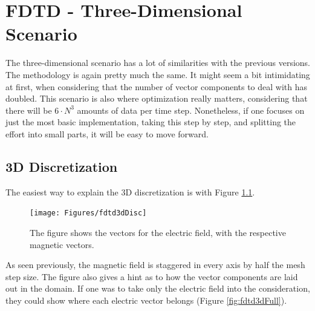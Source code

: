 
\chapter{FDTD - Three-Dimensional Scenario} %

\label{Chapter4} %


The three-dimensional scenario has a lot of similarities with the previous versions. The methodology is again pretty much the same. It might seem a bit intimidating at first, when considering that the number of vector components to deal with has doubled. This scenario is also where optimization really matters, considering that there will be $6 \cdot N^3$ amounts of data per time step. Nonetheless, if one focuses on just the most basic implementation, taking this step by step, and splitting the effort into small parts, it will be easy to move forward.

\clearpage

\section{3D Discretization}

The easiest way to explain the 3D discretization is with Figure \ref{fig:fdtd3dDisc}.

\begin{figure}[h!]
	\centering
	\texttt{[image: Figures/fdtd3dDisc]}
	\decoRule
	\caption[3D Electric Discretization]{The figure shows the vectors for the electric field, with the respective magnetic vectors.}
	\label{fig:fdtd3dDisc}
\end{figure}

As seen previously, the magnetic field is staggered in every axis by half the mesh step size. The figure also gives a hint as to how the vector components are laid out in the domain. If one was to take only the electric field into the consideration, they could show where each electric vector belongs (Figure \ref{fig:fdtd3dFull}). 

